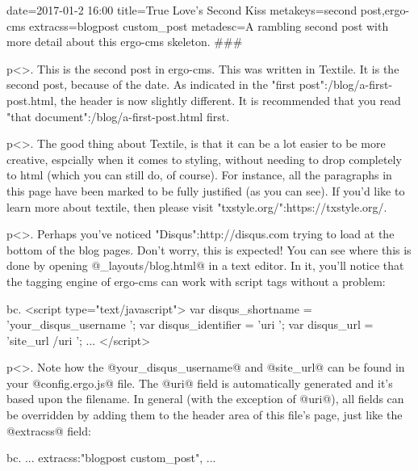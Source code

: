 date=2017-01-2 16:00
title=True Love's Second Kiss
metakeys=second post,ergo-cms
extracss=blogpost custom_post
metadesc=A rambling second post with more detail about this ergo-cms skeleton.
###

p<>. This is the second post in ergo-cms. This was written in Textile. It is the second post, because of the date. As indicated in the "first post":/blog/a-first-post.html, the header is now slightly different. It is recommended that you read "that document":/blog/a-first-post.html first.

p<>. The good thing about Textile, is that it can be a lot easier to be more creative, espcially when it comes to styling, without needing to drop completely to html (which you can still do, of course). For instance, all the paragraphs in this page have been marked to be fully justified (as you can see). If you'd like to learn more about textile, then please visit "txstyle.org/":https://txstyle.org/. 

p<>. Perhaps you've noticed "Disqus":http://disqus.com trying to load at the bottom of the blog pages. Don't worry, this is expected! You can see where this is done by opening @_layouts/blog.html@ in a text editor. In it, you'll notice that the tagging engine of ergo-cms can work with script tags without a problem:



bc. <script type="text/javascript">
	var disqus_shortname = '{your_disqus_username }';
	var disqus_identifier = '{uri }';
	var disqus_url = '{site_url }/{uri }';
	...
</script>

p<>. Note how the @your_disqus_username@ and @site_url@ can be found in your @config.ergo.js@ file. The @uri@ field is automatically generated and it's based upon the filename. In general (with the exception of @uri@), all fields can be overridden by adding them to the header area of this file's page, just like the @extracss@ field:

bc. {
...
extracss:"blogpost custom_post",
...
}


